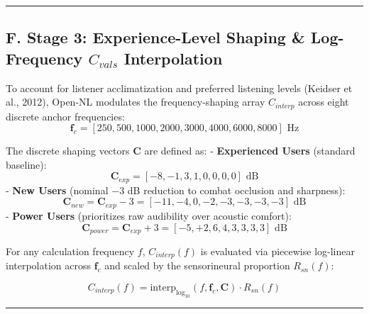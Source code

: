 \documentclass[
]{article}
\begin{document}
\begin{center}\rule{0.5\linewidth}{0.5pt}\end{center}

\subsection{\texorpdfstring{F. Stage 3: Experience-Level Shaping \&
Log-Frequency \(C_{vals}\)
Interpolation}{F. Stage 3: Experience-Level Shaping \& Log-Frequency C\_\{vals\} Interpolation}}\label{f.-stage-3-experience-level-shaping-log-frequency-c_vals-interpolation}

To account for listener acclimatization and preferred listening levels
(Keidser et al., 2012), Open-NL modulates the frequency-shaping array
\(C_{interp}\) across eight discrete anchor frequencies:
\begin{equation}
\mathbf{f}_c = [250, 500, 1000, 2000, 3000, 4000, 6000, 8000]\text{ Hz}
\end{equation}

The discrete shaping vectors \(\mathbf{C}\) are defined as: -
\textbf{Experienced Users} (standard baseline): \begin{equation}
  \mathbf{C}_{exp} = [-8, -1, 3, 1, 0, 0, 0, 0]\text{ dB}
  \end{equation} - \textbf{New Users} (nominal \(-3\) dB reduction to
combat occlusion and sharpness): \begin{equation}
  \mathbf{C}_{new} = \mathbf{C}_{exp} - 3 = [-11, -4, 0, -2, -3, -3, -3, -3]\text{ dB}
  \end{equation} - \textbf{Power Users} (prioritizes raw audibility over
acoustic comfort): \begin{equation}
  \mathbf{C}_{power} = \mathbf{C}_{exp} + 3 = [-5, +2, 6, 4, 3, 3, 3, 3]\text{ dB}
  \end{equation}

For any calculation frequency \(f\), \(C_{interp}(f)\) is evaluated via
piecewise log-linear interpolation across \(\mathbf{f}_c\) and scaled by
the sensorineural proportion \(R_{sn}(f)\):

\begin{equation}
C_{interp}(f) = \text{interp}_{\log_{10}}\left(f, \mathbf{f}_c, \mathbf{C}\right) \cdot R_{sn}(f)
\end{equation}

\begin{center}\rule{0.5\linewidth}{0.5pt}\end{center}
\end{document}
